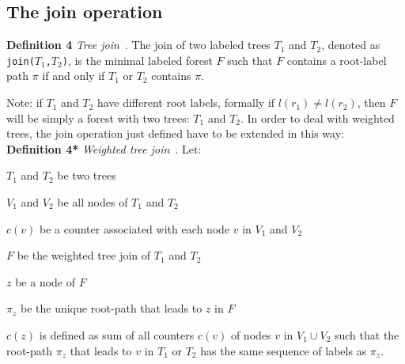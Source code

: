 \documentclass[a4paper,10pt]{report}
\begin{document}
\subsection{The join operation}

\textbf{Definition 4} \emph{Tree join}~\cite{kccf}.
The join of two labeled trees $T_1$ and $T_2$, denoted as
\texttt{join(}$T_1$\texttt{,}$T_2$\texttt{)},
is the minimal labeled forest $F$ such that $F$ contains a root-label path $\pi$ if and
only if $T_1$ or $T_2$ contains $\pi$.

Note: if $T_1$ and $T_2$ have different root labels,
formally if $l(r_1)\ne l(r_2)$, then $F$ will be simply a forest with two trees: $T_1$ and $T_2$. In order to deal with weighted trees, the join operation just defined have to be extended in this way: \\

\noindent
\textbf{Definition 4*} \emph{Weighted tree join}~\cite{kccf}.
Let:

\renewcommand{\labelitemi}{$-$}

\begin{itemize*}
\item $T_1$ and $T_2$ be two trees
\item $V_1$ and $V_2$ be all nodes of $T_1$ and $T_2$
\item $c(v)$ be a counter associated with each node $v$ in $V_1$ and $V_2$
\item $F$ be the weighted tree join of $T_1$ and $T_2$
\item $z$ be a node of $F$
\item $\pi_z$ be the unique root-path that leads to $z$ in $F$
\end{itemize*}
\renewcommand{\labelitemi}{$\bullet$}
$c(z)$ is defined as sum of all counters $c(v)$ of nodes $v$ in $V_1 \cup V_2$ such
that the root-path $\pi_z$ that leads to $v$ in $T_1$ or $T_2$ has the same sequence of
labels as $\pi_z$.
\end{document}
